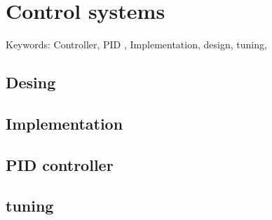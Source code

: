 \chapter{Control systems}

Keywords:  Controller, PID , Implementation, design, tuning, 

\section{Desing}
\section{Implementation}
\section{PID controller}
\section{tuning}
